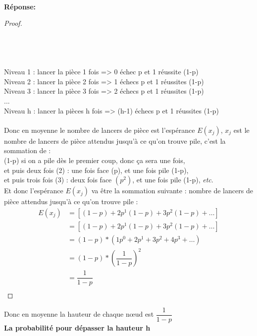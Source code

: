 \documentclass[hidelinks,a4paper,12pt]{article}
\begin{document}
~\\
\textbf {Réponse:}
\begin{proof}
~\\	\\
\\
 \\ \\
Niveau 1 : lancer la pièce 1 fois => 0 échec p et 1 réussite (1-p) \\
Niveau 2 : lancer la pièce 2 fois => 1 échecs p et 1 réussites (1-p) \\
Niveau 3 : lancer la pièce 3 fois => 2 échecs p et 1 réussites (1-p) \\
... \\
Niveau h : lancer la pièces h fois => (h-1) échecs p et 1 réussites (1-p) \\ \\
Donc en moyenne le nombre de lancers de pièce est l'espérance $E(x_j)$, $x_j$ est le
nombre de lancers de pièce attendus jusqu'à ce qu'on trouve pile, c'est la sommation de : \\
(1-p) si on a pile dès le premier coup, donc ça sera une fois, \\ 
et puis deux fois (2) : une fois face (p), et une fois pile (1-p), \\
et puis trois fois (3) : deux fois face $(p^2)$, et une fois pile (1-p), 
\textit{etc}. \\
Et donc l'espérance $E(x_j)$ va être la sommation suivante :
nombre de lancers de pièce attendus jusqu'à ce qu'on trouve pile :		
\begin{equation} 
	\begin{aligned}
		E(x_j) & = [ (1-p) + 2p^1 (1-p) + 3p^2(1-p)+ … ] \nonumber \\
& = [ (1-p) + 2p^1 (1-p) + 3p^2(1-p)+ … ] \nonumber \\
& = (1-p) * ( 1p^0 + 2p^1 + 3p^2 + 4p^3 + … ) \nonumber \\
& = (1-p) * (\dfrac{1}{1-p})^2  \nonumber \\
& = \dfrac{1}{1-p} \nonumber \\
\end{aligned}
\end{equation}
\end{proof}
Donc en moyenne la hauteur de chaque nœud est $\dfrac{1}{1-p}$
\\[1cm]
\textbf {La probabilité pour dépasser la hauteur h}\medskip \\
\end{document}
